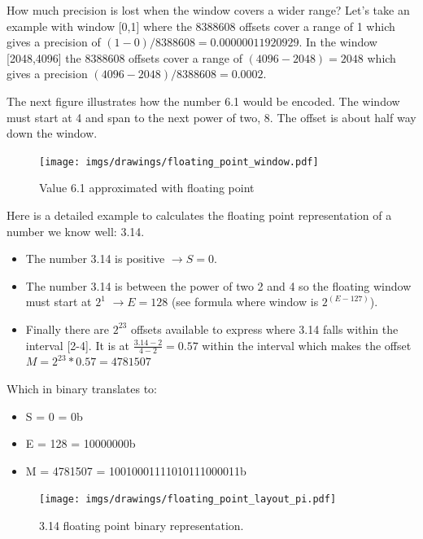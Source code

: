 \documentclass[book.tex]{subfiles}
\begin{document}
\par {} How much precision is lost when the window covers a wider range? Let's take an example with window [0,1] where the 8388608 offsets cover a range of 1 which gives a precision of $(1-0)/8388608=0.00000011920929$. In the window [2048,4096] the 8388608 offsets cover a range of $(4096-2048) = 2048$ which gives a precision $ (4096-2048)/8388608=0.0002$.\\
\par

The next figure illustrates how the number 6.1 would be encoded. The window must start at 4 and span to the next power of two, 8. The offset is about half way down the window.

\begin{figure}[H]
\centering
\texttt{[image: imgs/drawings/floating\_point\_window.pdf]}

\caption{Value 6.1 approximated with floating point}
\label{fig:fp_internals_window6_1}
\end{figure}
  \bigskip
  
Here is a detailed example to calculates the floating point representation of a number we know well: 3.14.
\begin{itemize}
 \item The number 3.14 is positive  $\rightarrow S=0$.
 \item The number 3.14 is between the power of two 2 and 4 so the floating window must start at $2^1$  $\rightarrow E=128$ (see formula where window is $2^{(E-127)}$).
 \item Finally there are $2^{23}$ offsets available to express where 3.14 falls within the interval [2-4]. It is at $\frac{3.14 -2 }{4 - 2} = 0.57$ within the interval which makes the offset $ M = 2^{23}*0.57 = 4781507$
\end{itemize}

Which in binary translates to:

\begin{itemize}
\item S = 0 = 0b
\item E = 128 = 10000000b
\item M = 4781507 = 10010001111010111000011b
\end{itemize}

\begin{figure}[H]
\centering
\texttt{[image: imgs/drawings/floating\_point\_layout\_pi.pdf]}
\caption{3.14 floating point binary representation.}
\label{fig:fp_internals}
\end{figure}
  \bigskip
\end{document}
